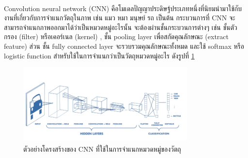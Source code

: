 Convolution neural network (CNN)\textsuperscript{\cite{cnn}} คือโมเดลปัญญาประดิษฐ์ประเภทหนึ่งที่นิยมนำมาใช้กับงานที่เกี่ยวกับการจำแนกวัตถุในภาพ เช่น แมว หมา มนุษย์ รถ เป็นต้น
กระบวนการที่ CNN จะสามารถจำแนกภาพออกมาได้ว่าเป็นหมวดหมู่อะไรนั้น จะต้องผ่านชั้นกระบวนการต่างๆ เช่น ชั้นตัวกรอง (filter) หรือเคอร์เนล (kernel) , ชั้น pooling layer 
เพื่อสกัดคุณลักษณะ (extract feature) ส่วน ชั้น fully connected layer  จะรวบรวมคุณลักษณะทั้งหมด และใช้ softmax หรือ logistic function  สำหรับใช้ในการจำแนกว่าเป็นวัตถุหมวดหมู่อะไร ดังรูปที่ \ref{fig:CNN architecture}

\begin{figure}[!ht]
	\centering
	\includegraphics[width=0.8\textwidth]{chapter2/images/CNN.png}
		\caption[ตัวอย่างโครงสร้างของ CNN ที่ใช้ในการจำแนกหมวดหมู่ของวัตถุ]{ตัวอย่างโครงสร้างของ CNN ที่ใช้ในการจำแนกหมวดหมู่ของวัตถุ\textsuperscript{\cite{cnn}}}
    	\label{fig:CNN architecture}
\end{figure}

